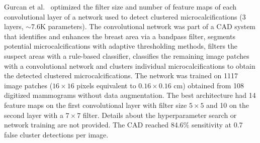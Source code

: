 \begin{comment}
- detect microcalcificication
- compares the optimized version with a manually selected one.
- 108 digitized mamograms for training, 152 for validation and 472 for test(253 malignant) (pixel size 0.1mm)
- Each region is preprocessed to retain the breast, each possible microcalcification is segmented and then they are classified. Classification: rule based classifier, then the convnet and then each microcalcification is regionally clustered
- optimizes number of feature mpas per layer and filter sizes
- used simulated annealing, a genentic algorithm and hillclimbing, with the AUC as the objective function.
- some of the false positives detected were deleted. dataset balanced
- from 77.2 %
-"The optima! architecture (N1-N2-K1-K2) was determined to be 14-4-5-5 when the architecture was trained with group ! and tested with group 2 and 14-10-5-7 when the training and thetest sets were switched."
- accuracy can be improved by seleecting a good architecture (it clashes with wath people teaches now).
- using bad scanners results in lower performance.
- 14 and 10 feature maps seem to be the max possible feature maps (from Gurcan2000). result is not valid then. WOuldn't be useful anyway
- Don't say the total number of preselected ROIs in the test set
- Don't say how each method works or what ranges each looks for, or how did the selected architectures compare to the not selected ones.
- Don't say exactly what method was used GA, simulated annealing(i think this one!) or hill-climbing.
\end{comment}
Gurcan et al.~\cite{Gurcan2002} optimized the filter size and number of feature maps of each convolutional layer of a network used to detect clustered microcalcifications (3 layers, $\sim$7.6K parameters). The convolutional network was part of a CAD system that identifies and enhances the breast area via a bandpass filter, segments potential microcalcifications with adaptive thresholding methods, filters the suspect areas with a rule-based classifier, classifies the remaining image patches with a convolutional network and clusters individual microcalcifications to obtain the detected clustered microcalcifications. The network was trained on 1117 image patches ($16 \times 16$ pixels equivalent to $0.16 \times 0.16$ cm) obtained from 108 digitized mammograms without data augmentation. The best architecture had 14 feature maps on the first convolutional layer with filter size $5\times 5$ and 10 on the second layer with a $7 \times 7$ filter. Details about the hyperparameter search or network training are not provided. The CAD reached 84.6\% sensitivity at 0.7 false cluster detections per image. 
